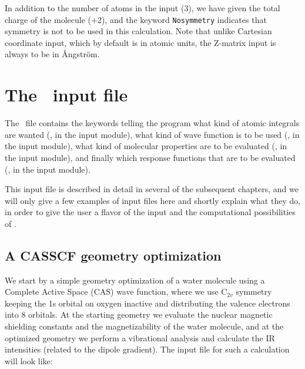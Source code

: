 In addition to the number of atoms in the input (3), we have given the
total charge of the
molecule ($+2$), and the keyword \verb|Nosymmetry| indicates that
symmetry is not to be used in this calculation. Note that
unlike Cartesian coordinate input, which by default is in atomic units, the
Z-matrix input is always to be in \AA ngstr\"{o}m.

\section{The \dalinp\ input file}\label{sec:daltoninp}

The \dalinp\ file contains the keywords telling the program
what kind of atomic integrals are wanted
({\her}, in the  input module), what kind of wave
function is to be used ({\sir}, in the
 input
module), what kind of molecular properties  are
to be evaluated (\aba , in the  input module), and
finally which response functions that are to
be evaluated (\resp , in
the  input module).

This input file is described in detail in several of the subsequent chapters,
and we will  only give a few examples of input files here and shortly
explain what they do, in order to give the user a flavor of the input
and the computational possibilities
of {\dalton}.

\subsection{A CASSCF geometry optimization}

We start by a simple geometry optimization 
of a water molecule using a Complete 
Active Space (CAS) wave function, where we use C$_{2v}$ symmetry
keeping the 1s orbital on oxygen inactive and distributing the valence
electrons  into 8 orbitals. At the starting geometry we
evaluate the nuclear magnetic shielding constants 
and the magnetizability of the water
molecule, and at the optimized geometry we perform a vibrational
analysis and calculate the IR
intensities 
(related to the dipole
gradient). The input file for such a calculation will look like:

